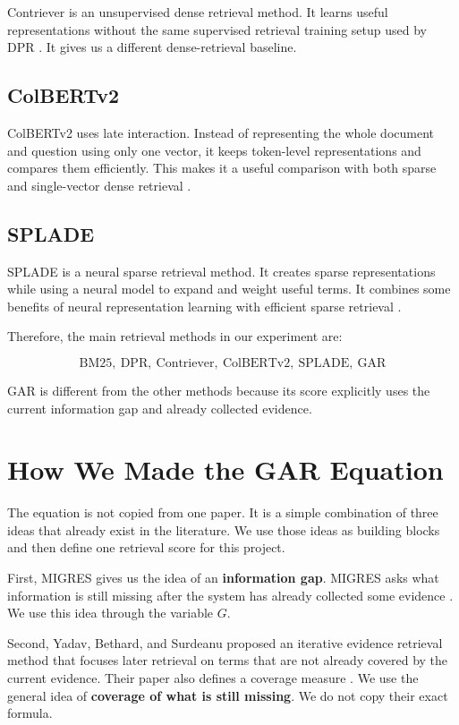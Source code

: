 \documentclass[11pt,a4paper]{article}
\begin{document}
Contriever is an unsupervised dense retrieval method. It learns useful representations without the same supervised retrieval training setup used by DPR \cite{contriever}. It gives us a different dense-retrieval baseline.

\subsection{ColBERTv2}

ColBERTv2 uses late interaction. Instead of representing the whole document and question using only one vector, it keeps token-level representations and compares them efficiently. This makes it a useful comparison with both sparse and single-vector dense retrieval \cite{colbert}.

\subsection{SPLADE}

SPLADE is a neural sparse retrieval method. It creates sparse representations while using a neural model to expand and weight useful terms. It combines some benefits of neural representation learning with efficient sparse retrieval \cite{splade}.

Therefore, the main retrieval methods in our experiment are:

\[
\boxed{
\text{BM25},\ \text{DPR},\ \text{Contriever},\ \text{ColBERTv2},\ \text{SPLADE},\ \text{GAR}
}
\]

GAR is different from the other methods because its score explicitly uses the current information gap and already collected evidence.


\section{How We Made the GAR Equation}

The equation is not copied from one paper. It is a simple combination of three ideas that already exist in the literature. We use those ideas as building blocks and then define one retrieval score for this project.

First, MIGRES gives us the idea of an \textbf{information gap}. MIGRES asks what information is still missing after the system has already collected some evidence \cite{migres}. We use this idea through the variable $G$.

Second, Yadav, Bethard, and Surdeanu proposed an iterative evidence retrieval method that focuses later retrieval on terms that are not already covered by the current evidence. Their paper also defines a coverage measure \cite{air}. We use the general idea of \textbf{coverage of what is still missing}. We do not copy their exact formula.
\end{document}
